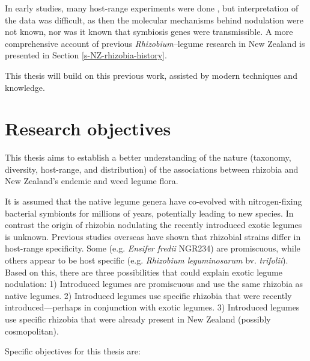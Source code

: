 In early studies, many host-range experiments were done
\citep{Greenwood69,Jarvis77,Crow81}, but interpretation of the data
was difficult, as then the molecular mechanisms behind nodulation
were not known, nor was it known that symbiosis genes were
transmissible. A more comprehensive account of previous
\emph{Rhizobium}--legume research in New Zealand is presented in
Section \ref{s-NZ-rhizobia-history}.

This thesis will build on this previous work, assisted by modern
techniques and knowledge.

\section{Research objectives}

This thesis aims to establish a better understanding of the nature
(taxonomy, diversity, host-range, and distribution) of the
associations between rhizobia and New Zealand's endemic and weed
legume flora.

It is assumed that the native legume genera have co-evolved with
nitrogen-fixing bacterial symbionts for millions of years,
potentially leading to new species. In contrast the origin of
rhizobia nodulating the recently introduced exotic legumes is
unknown. Previous studies overseas \citep[reviewed by][]{Perret00}
have shown that rhizobial strains differ in host-range specificity.
Some (e.g. \emph{Ensifer fredii} NGR234) are promiscuous, while
others appear to be host specific (e.g. \emph{Rhizobium
leguminosarum} bv. \emph{trifolii}). Based on this, there are three
possibilities that could explain exotic legume nodulation: 1)
Introduced legumes are promiscuous and use the same rhizobia as
native legumes. 2) Introduced legumes use specific rhizobia that
were recently introduced---perhaps in conjunction with exotic
legumes. 3) Introduced legumes use specific rhizobia that were
already present in New Zealand (possibly cosmopolitan).


Specific objectives for this thesis are:

